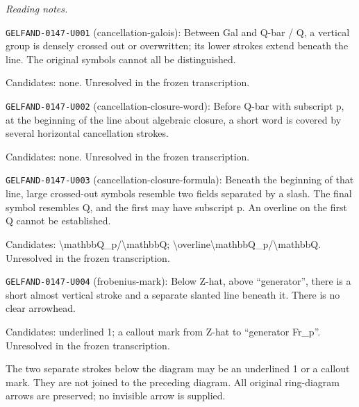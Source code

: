 \par\smallskip\noindent\textit{Reading notes.}\par
\noindent\texttt{GELFAND-0147-U001} (cancellation-galois): Between Gal and Q-bar / Q, a vertical group is densely crossed out or overwritten; its lower strokes extend beneath the line. The original symbols cannot all be distinguished.\par
Candidates: none. Unresolved in the frozen transcription.\par
\noindent\texttt{GELFAND-0147-U002} (cancellation-closure-word): Before Q-bar with subscript p, at the beginning of the line about algebraic closure, a short word is covered by several horizontal cancellation strokes.\par
Candidates: none. Unresolved in the frozen transcription.\par
\noindent\texttt{GELFAND-0147-U003} (cancellation-closure-formula): Beneath the beginning of that line, large crossed-out symbols resemble two fields separated by a slash. The final symbol resembles Q, and the first may have subscript p. An overline on the first Q cannot be established.\par
Candidates: \textbackslash{}mathbb{Q}\_p/\textbackslash{}mathbb{Q}; \textbackslash{}overline{\textbackslash{}mathbb{Q}}\_p/\textbackslash{}mathbb{Q}. Unresolved in the frozen transcription.\par
\noindent\texttt{GELFAND-0147-U004} (frobenius-mark): Below Z-hat, above “generator”, there is a short almost vertical stroke and a separate slanted line beneath it. There is no clear arrowhead.\par
Candidates: underlined 1; a callout mark from Z-hat to “generator Fr\_p”. Unresolved in the frozen transcription.\par
The two separate strokes below the diagram may be an underlined 1 or a callout mark. They are not joined to the preceding diagram. All original ring-diagram arrows are preserved; no invisible arrow is supplied.\par


